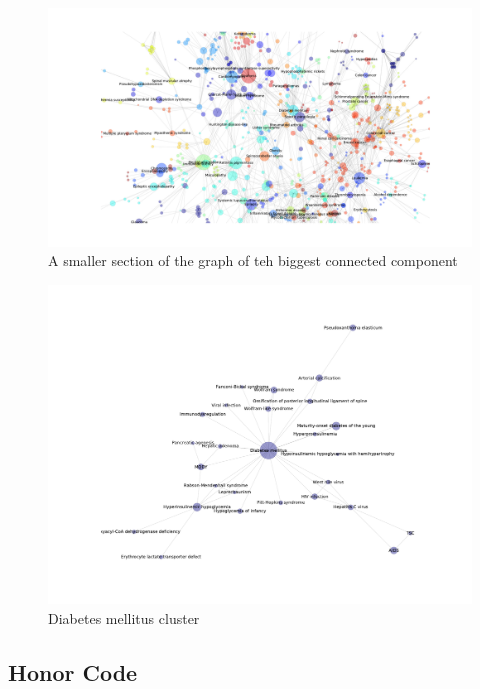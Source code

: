 \documentclass[a4paper,11pt]{article}
\begin{document}
\begin{figure}[htbp]
    \begin{center}
        \includegraphics[scale=0.3]{img/izrez.pdf}
        \caption{A smaller section of the graph of teh biggest connected component}
        \label{izsek}
    \end{center}
\end{figure}

\begin{figure}[htbp]
    \begin{center}
        \includegraphics[scale=0.5]{img/diabetesmellitus3.pdf}
        \caption{Diabetes mellitus cluster}
        \label{diabetesmellitus3}
    \end{center}
\end{figure}


\subsection*{Honor Code}
\end{document}
